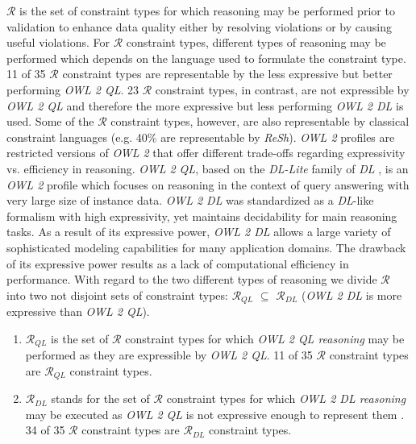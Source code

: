 \documentclass{acm_proc_article-sp}
\begin{document}
$\mathcal{R}$ is the set of constraint types for which reasoning may be performed prior to validation 
to enhance data quality either by resolving violations or by causing useful violations.
For $\mathcal{R}$ constraint types, different types of reasoning may be performed
which depends on the language used to formulate the constraint type. 
11 of 35 $\mathcal{R}$ constraint types are representable by the less expressive but better performing \emph{OWL 2 QL}.
23 $\mathcal{R}$ constraint types, in contrast, are not expressible by \emph{OWL 2 QL} and therefore the more expressive but less performing \emph{OWL 2 DL} is used.
Some of the $\mathcal{R}$ constraint types, however, are also representable by classical constraint languages (e.g. 40\% are representable by \emph{ReSh}).
\emph{OWL 2} profiles are restricted versions of \emph{OWL 2} that offer different trade-offs regarding expressivity vs. efficiency in reasoning. 
\emph{OWL 2 QL}, based on the \textit{DL-Lite} family of \emph{DL} \cite{Artale2009,Calvanese2007}, is an \emph{OWL 2} profile which focuses on reasoning in the context of query answering with very large size of instance data. 
\emph{OWL 2 DL} was standardized as a \emph{DL}-like formalism with high expressivity, yet maintains decidability for main reasoning tasks.
As a result of its expressive power, \emph{OWL 2 DL} allows a large variety of sophisticated modeling capabilities for many application domains.
The drawback of its expressive power results as a lack of computational efficiency in performance. 
With regard to the two different types of reasoning
we divide $\mathcal{R}$ into two not disjoint sets of constraint types: 
$\mathcal{R}_{QL}$ $\subseteq$ $\mathcal{R}_{DL}$ (\emph{OWL 2 DL} is more expressive than \emph{OWL 2 QL}).
\begin{enumerate}
\item $\mathcal{R}_{QL}$ is the set of $\mathcal{R}$ constraint types for which \emph{OWL 2 QL reasoning} may be performed as they are expressible by \emph{OWL 2 QL}.
11 of 35 $\mathcal{R}$ constraint types are $\mathcal{R}_{QL}$ constraint types.
\item $\mathcal{R}_{DL}$ stands for the set of $\mathcal{R}$ constraint types for which \emph{OWL 2 DL reasoning} may be executed as \emph{OWL 2 QL} is not expressive enough to represent them \cite{owl2profiles2008}.
34 of 35 $\mathcal{R}$ constraint types are $\mathcal{R}_{DL}$ constraint types.
\end{enumerate}
\end{document}
